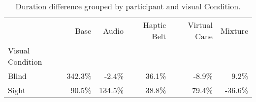 
\begin{table}[!htb]
\centering
\caption{Duration difference grouped by participant and visual Condition.}
\label{tab:duracao_var_group}
\begin{tabular}{lrrrrr}
\toprule
{} &    Base &   Audio & Haptic Belt & Virtual Cane & Mixture \\
Visual Condition &         &         &             &              &         \\
\midrule
Blind            &  342.3\% &   -2.4\% &       36.1\% &        -8.9\% &    9.2\% \\
Sight            &   90.5\% &  134.5\% &       38.8\% &        79.4\% &  -36.6\% \\
\bottomrule
\end{tabular}
\end{table}


